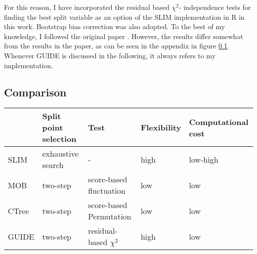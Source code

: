 For this reason, I have incorporated the residual based $\chi^2$- independence tests for finding the best split variable as an option of the SLIM implementation in R in this work. Bootstrap bias correction was also adopted. To the best of my knowledge, I followed the original paper \citep{.2002}. However, the results differ somewhat from the results in the paper, as can be seen in the appendix in figure \ref{}. 
Whenever GUIDE is discussed in the following, it always refers to my implementation. 







\subsection{Comparison}
\begin{table}[ht]
\centering
\begin{tabular}{lllll}
  \hline
 & Split point selection & Test & Flexibility & Computational cost  \\ 
  \hline
    SLIM & exhaustive search & - & high & low-high  \\ 
    MOB & two-step & score-based fluctuation & low & low  \\ 
    CTree & two-step & score-based Permutation & low & low  \\ 
    GUIDE & two-step & residual-based $\chi^2$  & high & low  \\ 
   \hline
\end{tabular}
\end{table}
\citep{Schlosser.2019}


